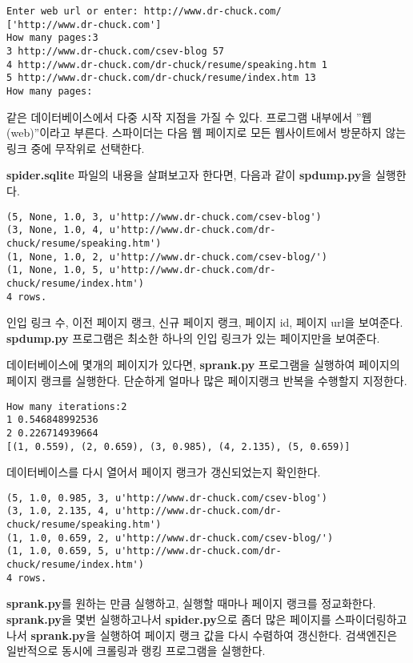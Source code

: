 \beforeverb
\begin{verbatim}
Enter web url or enter: http://www.dr-chuck.com/
['http://www.dr-chuck.com']
How many pages:3
3 http://www.dr-chuck.com/csev-blog 57
4 http://www.dr-chuck.com/dr-chuck/resume/speaking.htm 1
5 http://www.dr-chuck.com/dr-chuck/resume/index.htm 13
How many pages:
\end{verbatim}
\afterverb
%

같은 데이터베이스에서 다중 시작 지점을 가질 수 있다.
프로그램 내부에서 ''웹(web)''이라고 부른다.
스파이더는 다음 웹 페이지로 모든 웹사이트에서 방문하지 않는 링크 중에 무작위로 선택한다. 

{\bf spider.sqlite} 파일의 내용을 살펴보고자 한다면, 다음과 같이 {\bf spdump.py}을 실행한다.

\beforeverb
\begin{verbatim}
(5, None, 1.0, 3, u'http://www.dr-chuck.com/csev-blog')
(3, None, 1.0, 4, u'http://www.dr-chuck.com/dr-chuck/resume/speaking.htm')
(1, None, 1.0, 2, u'http://www.dr-chuck.com/csev-blog/')
(1, None, 1.0, 5, u'http://www.dr-chuck.com/dr-chuck/resume/index.htm')
4 rows.
\end{verbatim}
\afterverb
%

인입 링크 수, 이전 페이지 랭크, 신규 페이지 랭크, 페이지 id, 페이지 url을 보여준다.
{\bf spdump.py} 프로그램은 최소한 하나의 인입 링크가 있는 페이지만을 보여준다.

데이터베이스에 몇개의 페이지가 있다면, {\bf sprank.py} 프로그램을 실행하여
페이지의 페이지 랭크를 실행한다. 단순하게 얼마나 많은 페이지랭크 반복을 수행할지 지정한다.

\beforeverb
\begin{verbatim}
How many iterations:2
1 0.546848992536
2 0.226714939664
[(1, 0.559), (2, 0.659), (3, 0.985), (4, 2.135), (5, 0.659)]
\end{verbatim}
\afterverb
%

데이터베이스를 다시 열어서 페이지 랭크가 갱신되었는지 확인한다.

\beforeverb
\begin{verbatim}
(5, 1.0, 0.985, 3, u'http://www.dr-chuck.com/csev-blog')
(3, 1.0, 2.135, 4, u'http://www.dr-chuck.com/dr-chuck/resume/speaking.htm')
(1, 1.0, 0.659, 2, u'http://www.dr-chuck.com/csev-blog/')
(1, 1.0, 0.659, 5, u'http://www.dr-chuck.com/dr-chuck/resume/index.htm')
4 rows.
\end{verbatim}
\afterverb
%

{\bf sprank.py}를 원하는 만큼 실행하고, 실행할 때마나 페이지 랭크를 정교화한다.
{\bf sprank.py}을 몇번 실행하고나서 {\bf spider.py}으로 좀더 많은 페이지를 스파이더링하고 나서
{\bf sprank.py}을 실행하여 페이지 랭크 값을 다시 수렴하여 갱신한다. 검색엔진은 일반적으로 동시에
크롤링과 랭킹 프로그램을 실행한다.

